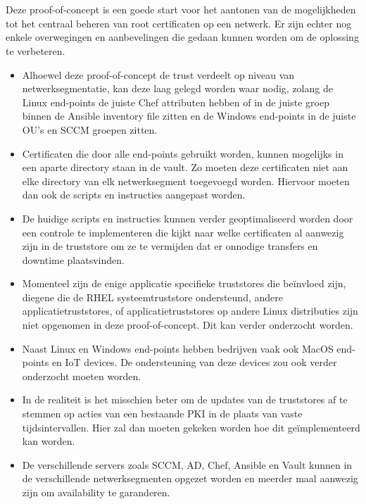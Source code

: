\section{}%
\label{sec:Overwegingen_en_aanbevelingen}
    Deze proof-of-concept is een goede start voor het aantonen van de mogelijkheden tot het centraal beheren van root certificaten op een netwerk. Er zijn echter nog enkele overwegingen en aanbevelingen die gedaan kunnen worden om de oplossing te verbeteren.
    \begin{itemize}
        \item Alhoewel deze proof-of-concept de trust verdeelt op niveau van netwerksegmentatie, kan deze laag gelegd worden waar nodig, zolang de Linux end-points de juiste Chef attributen hebben of in de juiste groep binnen de Ansible inventory file zitten en de Windows end-points in de juiste OU's en SCCM groepen zitten.
        \item Certificaten die door alle end-points gebruikt worden, kunnen mogelijks in een aparte directory staan in de vault. Zo moeten deze certificaten niet aan elke directory van elk netwerksegment toegevoegd worden. Hiervoor moeten dan ook de scripts en instructies aangepast worden.
        \item De huidige scripts en instructies kunnen verder geoptimaliseerd worden door een controle te implementeren die kijkt naar welke certificaten al aanwezig zijn in de truststore om ze te vermijden dat er onnodige transfers en downtime plaatsvinden.
        \item Momenteel zijn de enige applicatie specifieke truststores die beïnvloed zijn, diegene die de RHEL systeemtruststore ondersteund, andere applicatietruststores, of applicatietruststores op andere Linux distributies zijn niet opgenomen in deze proof-of-concept. Dit kan verder onderzocht worden.
        \item Naast Linux en Windows end-points hebben bedrijven vaak ook MacOS end-points en IoT devices. De ondersteuning van deze devices zou ook verder onderzocht moeten worden.
        \item In de realiteit is het misschien beter om de updates van de truststores af te stemmen op acties van een bestaande PKI in de plaats van vaste tijdsintervallen. Hier zal dan moeten gekeken worden hoe dit geïmplementeerd kan worden.
        \item De verschillende servers zoals SCCM, AD, Chef, Ansible en Vault kunnen in de verschillende netwerksegmenten opgezet worden en meerder maal aanwezig zijn om availability te garanderen.
    \end{itemize}

